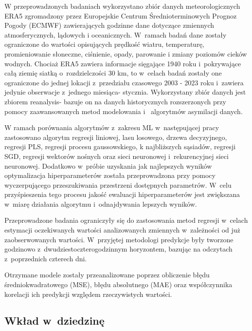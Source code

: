 W przeprowadzonych badaniach wykorzystano zbiór danych meteorologicznych ERA5
zgromadzony przez Europejskie Centrum Średnioterminowych Prognoz Pogody (ECMWF)
zawierających godzinne dane dotyczące zmiennych atmosferycznych, lądowych i
oceanicznych. W~ramach badań dane zostały ograniczone do wartości opisujących
prędkość wiatru, temperaturę, promieniowanie słoneczne, ciśnienie, opady, parowanie i
zmiany poziomów cieków wodnych. Chociaż ERA5 zawiera informacje sięgające 1940
roku i~pokrywające całą ziemię siatką o~rozdzielczości 30 km, 
to w~celach badań zostały one ograniczone do jednej lokacji z~przedziału czasowego 
2003 - 2023 roku i~zawiera jedynie obserwacje z~jednego miesiąca- stycznia. 
Wykorzystany zbiór danych jest zbiorem reanalysis- bazuje on na 
danych historycznych rozszerzonych przy pomocy zaawansowanych metod modelowania i~
algorytmów asymilacji danych.

W ramach porównania algorytmów z~zakresu ML w~następującej pracy zastosowano
algorytm regresji liniowej, lasu losowego, drzewa decyzyjnego, regresji PLS, 
regresji procesu gaussowskiego, k najbliższych sąsiadów, regresji SGD, 
regresji wektorów nośnych oraz sieci neuronowej i~rekurencyjnej sieci neuronowej. 
Dodatkowo w~próbie uzyskania jak najlepszych wyników optymalizacja hiperparameterów
została przeprowadzona przy pomocy wyczerpującego przeszukiwania przestrzeni 
dostępnych parametrów. W~celu przyśpieszenia tego procesu jakość ewaluacji 
hiperparameterów jest zwiększana w~miarę działania algorytmu i~odnajdywania lepszych
wyników.

Przeprowadzone badania ograniczyły się do zastosowania metod regresji w~celach
estymacji oczekiwanych wartości analizowanych zmiennych w~zależności
od już zaobserwowanych wartości. W~przyjętej metodologi predykcje były tworzone
godzinowo z~dwudziestoczterogodzinnym horyzontem, bazując na odczytach z~poprzednich
czterech dni.

Otrzymane modele zostały przeanalizowane poprzez obliczenie błędu 
średniokwadratowego (MSE), błędu absolutnego (MAE) oraz współczynnika korelacji
ich predykcji względem rzeczywistych wartości.

\subsection{Wkład w~dziedzinę}

